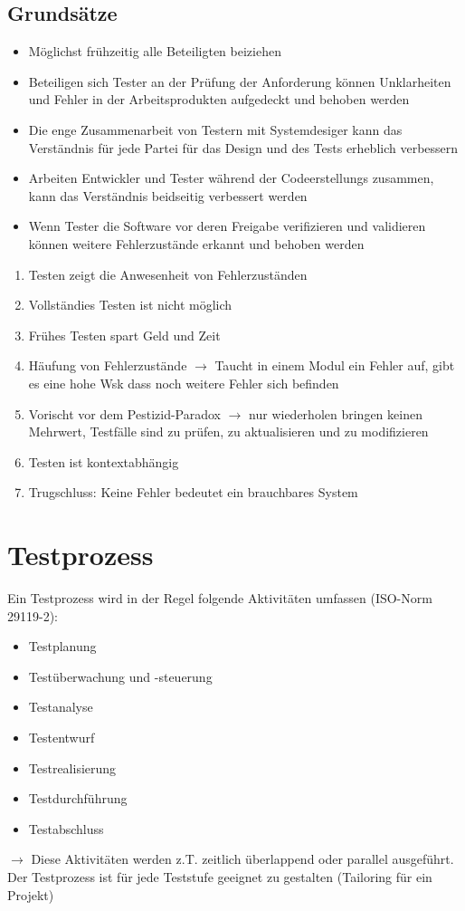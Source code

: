 \documentclass{report}
\theoremstyle{definition}
\theoremstyle{example}
\begin{document}
\section{Grundsätze}
\begin{itemize}
   \item Möglichst frühzeitig alle Beteiligten beiziehen
   \item Beteiligen sich Tester an der Prüfung der Anforderung können Unklarheiten und Fehler in der Arbeitsprodukten aufgedeckt und behoben werden
   \item Die enge Zusammenarbeit von Testern mit Systemdesiger kann das Verständnis für jede Partei für das Design und des Tests erheblich verbessern
   \item Arbeiten Entwickler und Tester während der Codeerstellungs zusammen, kann das Verständnis beidseitig verbessert werden
   \item Wenn Tester die Software vor deren Freigabe verifizieren und validieren können weitere Fehlerzustände erkannt und behoben werden
\end{itemize}

\begin{enumerate}
   \item Testen zeigt die Anwesenheit von Fehlerzuständen
   \item Vollständies Testen ist nicht möglich
   \item Frühes Testen spart Geld und Zeit 
   \item Häufung von Fehlerzustände $\rightarrow$ Taucht in einem Modul ein Fehler auf, gibt es eine hohe Wsk dass noch weitere Fehler sich befinden
   \item Vorischt vor dem Pestizid-Paradox $\rightarrow$ nur wiederholen bringen keinen Mehrwert, Testfälle sind zu prüfen, zu aktualisieren und zu modifizieren
   \item Testen ist kontextabhängig
   \item Trugschluss: Keine Fehler bedeutet ein brauchbares System
\end{enumerate}

\chapter{Testprozess}
Ein Testprozess wird in der Regel folgende Aktivitäten umfassen (ISO-Norm 29119-2):
\begin{itemize}
   \item Testplanung
   \item Testüberwachung und -steuerung
   \item Testanalyse
   \item Testentwurf
   \item Testrealisierung
   \item Testdurchführung
   \item Testabschluss
\end{itemize}
$\rightarrow$ Diese Aktivitäten werden z.T. zeitlich überlappend oder parallel ausgeführt. Der Testprozess ist für jede Teststufe geeignet zu gestalten (Tailoring für ein Projekt)
\end{document}
